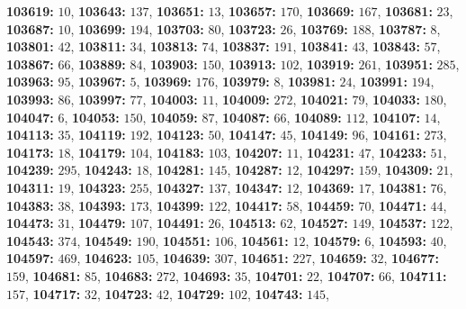 \textsf{\bfseries 103619:} $10$, \textsf{\bfseries 103643:} $137$, \textsf{\bfseries 103651:} $13$, \textsf{\bfseries 103657:} $170$, \textsf{\bfseries 103669:} $167$, \textsf{\bfseries 103681:} $23$, \textsf{\bfseries 103687:} $10$, \textsf{\bfseries 103699:} $194$, \textsf{\bfseries 103703:} $80$, \textsf{\bfseries 103723:} $26$, \textsf{\bfseries 103769:} $188$, \textsf{\bfseries 103787:} $8$, \textsf{\bfseries 103801:} $42$, \textsf{\bfseries 103811:} $34$, \textsf{\bfseries 103813:} $74$, \textsf{\bfseries 103837:} $191$, \textsf{\bfseries 103841:} $43$, \textsf{\bfseries 103843:} $57$, \textsf{\bfseries 103867:} $66$, \textsf{\bfseries 103889:} $84$, \textsf{\bfseries 103903:} $150$, \textsf{\bfseries 103913:} $102$, \textsf{\bfseries 103919:} $261$, \textsf{\bfseries 103951:} $285$, \textsf{\bfseries 103963:} $95$, \textsf{\bfseries 103967:} $5$, \textsf{\bfseries 103969:} $176$, \textsf{\bfseries 103979:} $8$, \textsf{\bfseries 103981:} $24$, \textsf{\bfseries 103991:} $194$, \textsf{\bfseries 103993:} $86$, \textsf{\bfseries 103997:} $77$, \textsf{\bfseries 104003:} $11$, \textsf{\bfseries 104009:} $272$, \textsf{\bfseries 104021:} $79$, \textsf{\bfseries 104033:} $180$, \textsf{\bfseries 104047:} $6$, \textsf{\bfseries 104053:} $150$, \textsf{\bfseries 104059:} $87$, \textsf{\bfseries 104087:} $66$, \textsf{\bfseries 104089:} $112$, \textsf{\bfseries 104107:} $14$, \textsf{\bfseries 104113:} $35$, \textsf{\bfseries 104119:} $192$, \textsf{\bfseries 104123:} $50$, \textsf{\bfseries 104147:} $45$, \textsf{\bfseries 104149:} $96$, \textsf{\bfseries 104161:} $273$, \textsf{\bfseries 104173:} $18$, \textsf{\bfseries 104179:} $104$, \textsf{\bfseries 104183:} $103$, \textsf{\bfseries 104207:} $11$, \textsf{\bfseries 104231:} $47$, \textsf{\bfseries 104233:} $51$, \textsf{\bfseries 104239:} $295$, \textsf{\bfseries 104243:} $18$, \textsf{\bfseries 104281:} $145$, \textsf{\bfseries 104287:} $12$, \textsf{\bfseries 104297:} $159$, \textsf{\bfseries 104309:} $21$, \textsf{\bfseries 104311:} $19$, \textsf{\bfseries 104323:} $255$, \textsf{\bfseries 104327:} $137$, \textsf{\bfseries 104347:} $12$, \textsf{\bfseries 104369:} $17$, \textsf{\bfseries 104381:} $76$, \textsf{\bfseries 104383:} $38$, \textsf{\bfseries 104393:} $173$, \textsf{\bfseries 104399:} $122$, \textsf{\bfseries 104417:} $58$, \textsf{\bfseries 104459:} $70$, \textsf{\bfseries 104471:} $44$, \textsf{\bfseries 104473:} $31$, \textsf{\bfseries 104479:} $107$, \textsf{\bfseries 104491:} $26$, \textsf{\bfseries 104513:} $62$, \textsf{\bfseries 104527:} $149$, \textsf{\bfseries 104537:} $122$, \textsf{\bfseries 104543:} $374$, \textsf{\bfseries 104549:} $190$, \textsf{\bfseries 104551:} $106$, \textsf{\bfseries 104561:} $12$, \textsf{\bfseries 104579:} $6$, \textsf{\bfseries 104593:} $40$, \textsf{\bfseries 104597:} $469$, \textsf{\bfseries 104623:} $105$, \textsf{\bfseries 104639:} $307$, \textsf{\bfseries 104651:} $227$, \textsf{\bfseries 104659:} $32$, \textsf{\bfseries 104677:} $159$, \textsf{\bfseries 104681:} $85$, \textsf{\bfseries 104683:} $272$, \textsf{\bfseries 104693:} $35$, \textsf{\bfseries 104701:} $22$, \textsf{\bfseries 104707:} $66$, \textsf{\bfseries 104711:} $157$, \textsf{\bfseries 104717:} $32$, \textsf{\bfseries 104723:} $42$, \textsf{\bfseries 104729:} $102$, \textsf{\bfseries 104743:} $145$, 
